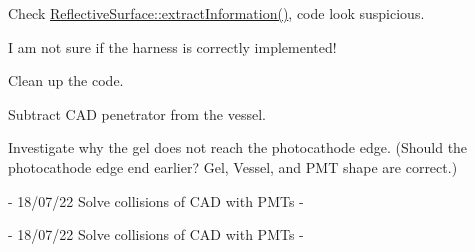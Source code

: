 
\begin{DoxyRefList}
\item[File \mbox{\hyperlink{_o_m_sim_data_file_types_8cc}{OMSim\+Data\+File\+Types.cc}} ]\label{todo__todo000001}%
%
Check \mbox{\hyperlink{class_reflective_surface_a5dff8f89e20cf4e629024fe3a1b1d78f}{Reflective\+Surface\+::extract\+Information()}}, code look suspicious.  
\item[File \mbox{\hyperlink{_o_m_sim_d_e_g_g_8cc}{OMSim\+DEGG.cc}} ]\label{todo__todo000002}%
%

\begin{DoxyItemize}
\item I am not sure if the harness is correctly implemented!
\item Clean up the code.
\item Subtract CAD penetrator from the vessel.
\item Investigate why the gel does not reach the photocathode edge. (Should the photocathode edge end earlier? Gel, Vessel, and PMT shape are correct.) 
\end{DoxyItemize}
\item[File \mbox{\hyperlink{_o_m_sim_detector_construction_8cc}{OMSim\+Detector\+Construction.cc}} ]\label{todo__todo000006}%
%
  
\item[File \mbox{\hyperlink{_o_m_sim_l_o_m16_8cc}{OMSim\+LOM16.cc}} ]\label{todo__todo000003}%
%
-\/ 18/07/22 Solve collisions of CAD with PMTs -\/ 
\item[File \mbox{\hyperlink{_o_m_sim_l_o_m18_8cc}{OMSim\+LOM18.cc}} ]\label{todo__todo000004}%
%
-\/ 18/07/22 Solve collisions of CAD with PMTs -\/ 
\item[File \mbox{\hyperlink{_o_m_sim_p_m_t_construction_8cc}{OMSim\+PMTConstruction.cc}} ]\label{todo__todo000005}%
%

\end{DoxyRefList}